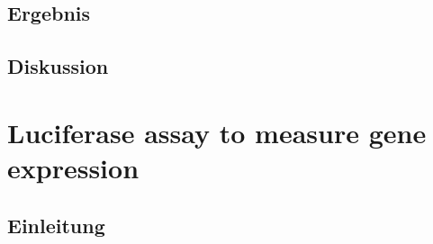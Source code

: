 \documentclass[oneside,10pt,a4paper]{report}
\begin{document}
			\subsection{Ergebnis}
			
			\subsection{Diskussion}
			
		\section{Luciferase assay to measure gene expression}
		
			\subsection{Einleitung}
			
\end{document}
